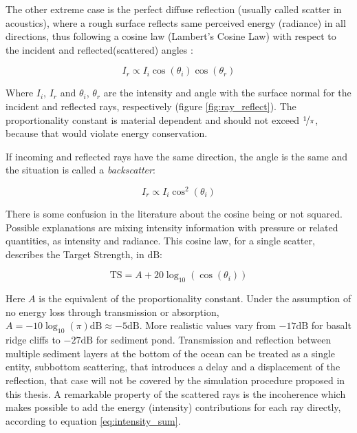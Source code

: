 The other extreme case is the perfect diffuse reflection (usually called scatter
in acoustics), where a rough surface reflects same perceived energy (radiance)
in all directions, thus following a cosine law (Lambert's Cosine Law) with
respect to the incident and reflected(scattered) angles
\cite{united1977geometrical,cox2004acoustic}:

\begin{equation}
\label{eq:lambertian}
I_r \propto	 I_i \cos(\theta_i) \cos(\theta_r)
\end{equation}

Where $I_i$,  $I_r$ and $\theta_i$, $\theta_r$ are the intensity and angle with
the surface normal for the incident and reflected rays,
respectively (figure \ref{fig:ray_reflect}). The proportionality constant is
material dependent and should not exceed $\nicefrac{1}{\pi}$, because that would violate
energy conservation.

If incoming and reflected rays have the same direction, the angle is the same
and the situation is called a \textit{backscatter}:

\begin{equation*}
I_r \propto I_i \cos^2(\theta_i)
\end{equation*}

There is some confusion in the literature about the cosine being or not
squared\cite{durany2015analytical,cox2006tutorial,cox2004acoustic,jones2009modelling,LURTON,Etter2013}.
Possible explanations are mixing intensity information with pressure
or related quantities, as intensity and radiance. This cosine law, for a single
scatter, describes the Target Strength, in $\text{dB}$:

\begin{equation*}
\text{TS} = A + 20\log_{10}(\cos(\theta_i))
\end{equation*}

Here $A$ is the equivalent of the proportionality constant. Under the assumption
of no energy loss through transmission or absorption,
$A=-10\log_{10}(\pi)\text{dB} \approx -5\text{dB}$. More realistic values vary
from $-17\text{dB}$ for basalt ridge cliffs to $-27\text{dB}$ for sediment
pond\cite{dunn2015springer}.
Transmission and reflection between multiple sediment layers at the bottom of
the ocean can be treated as a single entity, subbottom scattering, that introduces a
delay and a displacement of the reflection\cite{Etter2013}, that case will not
be covered by the simulation procedure proposed in this thesis. A remarkable
property of the scattered rays is the incoherence which makes possible to add
the energy (intensity) contributions for each ray directly, according to
equation \ref{eq:intensity_sum}.

